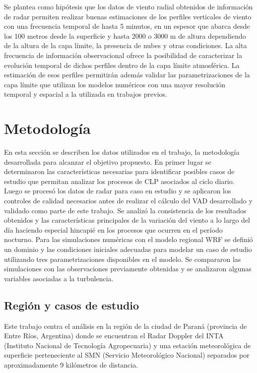 \documentclass[12pt,spanish,oneside, a4paper]{book}
\begin{document}
Se plantea como hipótesis que los datos de viento radial obtenidos de
información de radar permiten realizar buenas estimaciones de los
perfiles verticales de viento con una frecuencia temporal de hasta 5
minutos, en un espesor que abarca desde los 100 metros desde la
superficie y hasta 2000 o 3000 m de altura dependiendo de la altura de
la capa límite, la presencia de nubes y otras condiciones. La alta
frecuencia de información observacional ofrece la posibilidad de
caracterizar la evolución temporal de dichos perfiles dentro de la capa
límite atmosférica. La estimación de esos perfiles permitirán además
validar las parametrizaciones de la capa límite que utilizan los modelos
numéricos con una mayor resolución temporal y espacial a la utilizada en
trabajos previos.

\chapter{Metodología}\label{metodologia}

En esta sección se describen los datos utilizados en el trabajo, la
metodología desarrollada para alcanzar el objetivo propuesto. En primer
lugar se determinaron las características necesarias para identificar
posibles casos de estudio que permitan analizar los procesos de CLP
asociados al ciclo diario. Luego se procesó los datos de radar para caso
en estudio y se aplicaron los controles de calidad necesarios antes de
realizar el cálculo del VAD desarrollado y validado como parte de este
trabajo. Se analizó la consistencia de los resultados obtenidos y las
características principales de la variación del viento a lo largo del
día haciendo especial hincapié en los procesos que ocurren en el período
nocturno. Para las simulaciones numéricas con el modelo regional WRF se
definió un dominio y las condiciones iniciales adecuadas para modelar un
caso de estudio utilizando tres parametrizaciones disponibles en el
modelo. Se compararon las simulaciones con las observaciones previamente
obtenidas y se analizaron algunas variables asociadas a la turbulencia.

\section{Región y casos de estudio}\label{region-y-casos-de-estudio}

Este trabajo centra el análisis en la región de la ciudad de Paraná
(provincia de Entre Ríos, Argentina) donde se encuentran el Radar
Doppler del INTA (Instituto Nacional de Tecnología Agropecuaria) y una
estación meteorológica de superficie perteneciente al SMN (Servicio
Meteorológico Nacional) separados por aproximadamente 9 kilómetros de
distancia.
\end{document}
